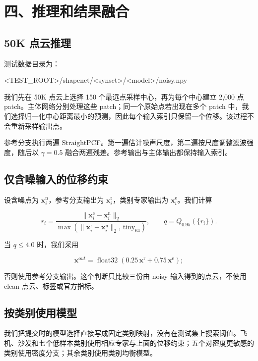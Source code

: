 \documentclass[UTF8,a4paper,11pt,fontset=fandol]{ctexart}
\begin{document}
\section{四、推理和结果融合}

\subsection{50K 点云推理}

测试数据目录为：

\begin{CodeBlock}
<TEST_ROOT>/shapenet/<synset>/<model>/noisy.npy
\end{CodeBlock}

我们先在 50K 点云上选择 150 个最远点采样中心，再为每个中心建立 2,000 点 patch。主体网络分别处理这些 patch；同一个原始点若出现在多个 patch 中，我们选择归一化中心距离最小的预测，因此每个输入索引只保留一个位移。该过程不会重新采样输出点。

参考分支执行两遍 StraightPCF。第一遍估计噪声尺度，第二遍按尺度调整滤波强度，随后以 $\gamma=0.5$ 融合两遍残差。参考输出与主体输出都保持输入索引。

\subsection{仅含噪输入的位移约束}

设含噪点为 $\mathbf{x}^{\mathrm n}_i$，参考分支输出为 $\mathbf{x}^{\mathrm r}_i$，类别专家输出为 $\mathbf{x}^{\mathrm e}_i$。我们计算

\[
r_i=\frac{\lVert\mathbf{x}^{\mathrm e}_i-\mathbf{x}^{\mathrm n}_i\rVert_2}
{\max\!\left(\lVert\mathbf{x}^{\mathrm r}_i-\mathbf{x}^{\mathrm n}_i\rVert_2,\,\mathrm{tiny}_{64}\right)},
\qquad q=Q_{0.95}(\{r_i\}).
\]

当 $q\le 4.0$ 时，我们采用

\[
\mathbf{x}^{\mathrm out}=\operatorname{float32}\!\left(
0.25\,\mathbf{x}^{\mathrm r}+0.75\,\mathbf{x}^{\mathrm e}
\right);
\]

否则使用参考分支输出。这个判断只比较三份由 noisy 输入得到的点云，不使用 clean 点云、标签或官方指标。

\subsection{按类别使用模型}

我们把提交时的模型选择直接写成固定类别映射，没有在测试集上搜索阈值。飞机、沙发和七个低样本类别使用相应专家与上面的位移约束；五个对密度更敏感的类别使用密度分支；其余类别使用类别均衡模型。
\end{document}

